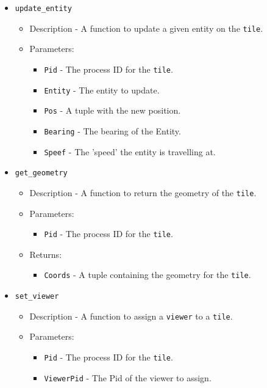 \begin{itemize}
	\item {\tt update\_entity}
		\begin{itemize}
			\item Description - A function to update a given entity on the \verb+tile+.
			\item Parameters:
				\begin{itemize}
					\item {\tt Pid} - The process ID for the \verb+tile+.
					\item {\tt Entity} - The entity to update.
					\item {\tt Pos} - A tuple with the new position.
					\item {\tt Bearing} - The bearing of the Entity.
					\item {\tt Speef} - The 'speed' the entity is travelling at.
				\end{itemize}
		\end{itemize}

	\item {\tt get\_geometry}
		\begin{itemize}
			\item Description - A function to return the geometry of the \verb+tile+.
			\item Parameters:
				\begin{itemize}
					\item {\tt Pid} - The process ID for the \verb+tile+.
				\end{itemize}
			\item Returns:
				\begin{itemize}
					\item {\tt Coords} - A tuple containing the geometry for the \verb+tile+.
				\end{itemize}
		\end{itemize}

	\item {\tt set\_viewer}
		\begin{itemize}
			\item Description - A function to assign a \verb+viewer+ to a \verb+tile+.
			\item Parameters:
				\begin{itemize}
					\item {\tt Pid} - The process ID for the \verb+tile+.
					\item {\tt ViewerPid} - The Pid of the viewer to assign.
				\end{itemize}
		\end{itemize}


\end{itemize}

